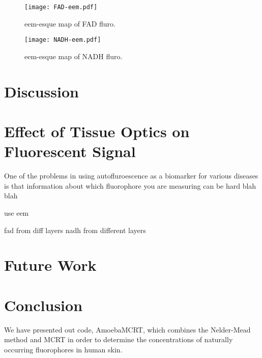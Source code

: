 \begin{figure}[!htpb]
    \centering
    \texttt{[image: FAD-eem.pdf]}
    \caption{eem-esque map of FAD fluro.}
    \label{fig:fadeem}
\end{figure}

\begin{figure}[!htpb]
    \centering
    \texttt{[image: NADH-eem.pdf]}
    \caption{eem-esque map of NADH fluro.}
    \label{fig:nadheem}
\end{figure}

\section{Discussion}

\section{Effect of Tissue Optics on Fluorescent Signal}

One of the problems in using autofluroescence as a biomarker for various diseases is that information about which fluorophore you are measuring can be hard blah blah

use eem

fad from diff layers
nadh from different layers


\section{Future Work}

\section{Conclusion}

We have presented out code, AmoebaMCRT, which combines the Nelder-Mead method and MCRT in order to determine the concentrations of naturally occurring fluorophores in human skin.



